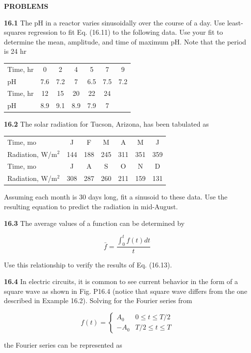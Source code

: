\documentclass[../main.tex]{subfiles}
\begin{document}
\noindent\textbf{PROBLEMS}
\begin{multicols}{2}
    \noindent\textbf{16.1} The pH in a reactor varies sinusoidally over the course
	of a day. Use least-squares regression to fit Eq. (16.11) to
	the following data. Use your fit to determine the mean,
	amplitude, and time of maximum pH. Note that the period
	is 24 hr

	\noindent
	\begin{tabular}{l c c c c c c}
		Time, hr & 0 & 2 & 4 & 5 & 7 & 9 \\
		pH & 7.6 & 7.2 & 7 & 6.5 & 7.5 & 7.2 \\
		Time, hr & 12 & 15 & 20 & 22 & 24 \\
		pH & 8.9 & 9.1 & 8.9 & 7.9 & 7
	\end{tabular}

	\noindent\textbf{16.2}  The solar radiation for Tucson, Arizona, has been tabulated as

	\noindent
	\begin{tabular}{l c c c c c c}
		Time, mo & J & F & M & A & M & J \\
		Radiation, W/m$^2$ & 144 & 188 & 245 & 311 & 351 & 359 \\
		Time, mo & J & A & S & O & N & D \\
		Radiation, W/m$^2$ & 308 & 287 & 260 & 211 & 159 & 131
	\end{tabular}

	\noindent Assuming each month is 30 days long, fit a sinusoid to these
	data. Use the resulting equation to predict the radiation in
	mid-August.

	\noindent\textbf{16.3} The average values of a function can be determined by

	$$
		\bar{f} = \frac{\int ^t _ 0 f(t) dt}{t}
	$$

	\noindent Use this relationship to verify the results of Eq. (16.13).

	\noindent\textbf{16.4} In electric circuits, it is common to see current
	behavior in the form of a square wave as shown in Fig. P16.4
	(notice that square wave differs from the one described in
	Example 16.2). Solving for the Fourier series from

	$$
		f(t) = \left\{ 
			\begin{matrix}
				A_0 & 0 \leq t \leq T/2 \\
				-A_0 & T/2 \leq t \leq T
			\end{matrix}
		\right.
	$$

	\noindent the Fourier series can be represented as


\end{multicols}
\end{document}
